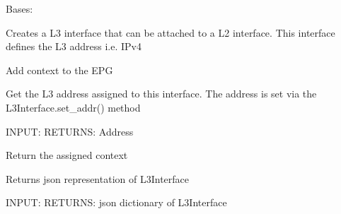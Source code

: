 \documentclass[letterpaper,10pt,english]{sphinxmanual}
\begin{document}

\begin{fulllineitems}
\label{acitoolkit:acitoolkit.L3Interface}
Bases: {\hyperref[acibaseobject:acibaseobject.BaseACIObject]{}}

Creates a L3 interface that can be attached to a L2 interface.
This interface defines the L3 address i.e. IPv4

\begin{fulllineitems}
\label{acitoolkit:acitoolkit.L3Interface.add_context}
Add context to the EPG

\end{fulllineitems}


\begin{fulllineitems}
\label{acitoolkit:acitoolkit.L3Interface.get_addr}
Get the L3 address assigned to this interface.
The address is set via the L3Interface.set\_addr() method

INPUT:
RETURNS: Address

\end{fulllineitems}


\begin{fulllineitems}
\label{acitoolkit:acitoolkit.L3Interface.get_context}
Return the assigned context

\end{fulllineitems}


\begin{fulllineitems}
\label{acitoolkit:acitoolkit.L3Interface.get_json}
Returns json representation of L3Interface

INPUT:
RETURNS: json dictionary of L3Interface

\end{fulllineitems}



\end{fulllineitems}
\end{document}
